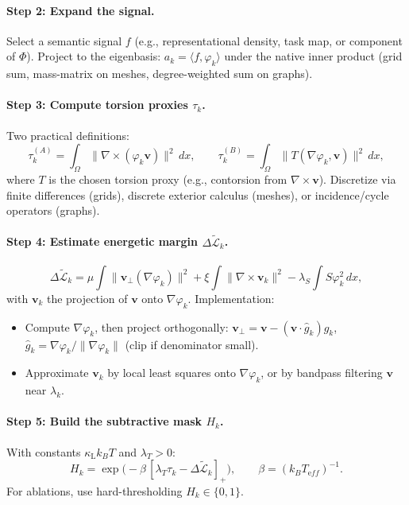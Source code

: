 \documentclass[a4paper,11pt]{article}
\begin{document}
\paragraph{Step 2: Expand the signal.}
Select a semantic signal $f$ (e.g., representational density, task map, or
component of $\Phi$). Project to the eigenbasis:
$a_k=\langle f,\varphi_k\rangle$ under the native inner product
(grid sum, mass-matrix on meshes, degree-weighted sum on graphs).

\paragraph{Step 3: Compute torsion proxies $\tau_k$.}
Two practical definitions:
\[
\tau_k^{(A)}=\int_\Omega \|\nabla\times(\varphi_k\mathbf v)\|^2\,dx,
\qquad
\tau_k^{(B)}=\int_\Omega \|T(\nabla\varphi_k,\mathbf v)\|^2\,dx,
\]
where $T$ is the chosen torsion proxy (e.g., contorsion from
$\nabla\times\mathbf v$).  
Discretize via finite differences (grids), discrete exterior calculus
(meshes), or incidence/cycle operators (graphs).

\paragraph{Step 4: Estimate energetic margin $\Delta\widetilde{\mathcal{L}}_k$.}
\[
\Delta\widetilde{\mathcal{L}}_k
=
\mu\int \|\mathbf v_\perp(\nabla\varphi_k)\|^2
+\xi \int \|\nabla\times \mathbf v_k\|^2
-\lambda_S \int S\varphi_k^2 \, dx,
\]
with $\mathbf v_k$ the projection of $\mathbf v$ onto $\nabla\varphi_k$.
Implementation:
\begin{itemize}
\item Compute $\nabla\varphi_k$, then project orthogonally:
$\mathbf v_\perp=\mathbf v-(\mathbf v\cdot \hat g_k)\hat g_k$,
$\hat g_k=\nabla\varphi_k/\|\nabla\varphi_k\|$ (clip if denominator small).
\item Approximate $\mathbf v_k$ by local least squares onto
$\nabla\varphi_k$, or by bandpass filtering $\mathbf v$ near $\lambda_k$.
\end{itemize}

\paragraph{Step 5: Build the subtractive mask $H_k$.}
With constants $\kappa_{\mathrm L}k_B T$ and $\lambda_T>0$:
\[
H_k=
\exp\!\big(-\beta\,[\lambda_T \tau_k - \Delta\widetilde{\mathcal{L}}_k]_+\big),
\qquad
\beta=(k_B T_{\mathrm eff})^{-1}.
\]
For ablations, use hard-thresholding $H_k\in\{0,1\}$.
\end{document}
